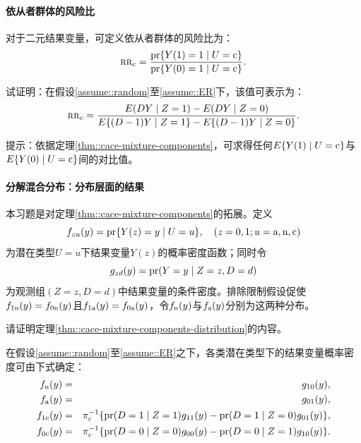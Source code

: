 \paragraph{依从者群体的风险比}\label{hw::rr-compliers}


对于二元结果变量，可定义依从者群体的风险比为：
$$
\textsc{rr}_{\textup{c}} = \frac{  \textup{pr}\{  Y(1) = 1\mid U = \textup{c} \}  }{ \textup{pr}\{  Y(0) = 1\mid U = \textup{c} \}   } .
$$

试证明：在假设\ref{assume::random}至\ref{assume::ER}下，该值可表示为：
$$
\textsc{rr}_{\textup{c}} =  \frac{  E(DY\mid Z=1)  - E(DY\mid Z=0)  }{  E\{  (D-1)Y\mid Z=1 \}   - E\{ (D-1)Y\mid Z=0 \} }.
$$



提示：依据定理\ref{thm::cace-mixture-components}，可求得任何$E\{  Y(1) \mid U = \textup{c} \} $与$E\{  Y(0) \mid U = \textup{c} \} $间的对比值。 


\paragraph{分解混合分布：分布层面的结果}\label{hw::disentangle-mixture-distrubution}


本习题是对定理\ref{thm::cace-mixture-components}的拓展。定义
$$
f_{zu}(y) = \textup{pr}\{  Y(z) = y  \mid U=u \},  \quad  (z=0,1;u=\textup{a}, \textup{n}, \textup{c})
$$
为潜在类型$U=u$下结果变量$Y(z)$的概率密度函数；同时令
$$
g_{zd}(y) = \textup{pr}(Y = y\mid Z=z, D=d)
$$
为观测组$(Z=z, D=d)$中结果变量的条件密度。排除限制假设促使$f_{1\textup{n}}(y) = f_{0\textup{n}} (y) $且$f_{1\textup{a}}(y) = f_{0\textup{a}}(y) $，令$f_{\textup{n}}(y)$与$ f_{\textup{a}} (y) $分别为这两种分布。 



请证明定理\ref{thm::cace-mixture-components-distribution}的内容。  


 
\begin{theorem}
\label{thm::cace-mixture-components-distribution}
在假设\ref{assume::random}至\ref{assume::ER}之下，各类潜在类型下的结果变量概率密度可由下式确定：
\begin{eqnarray*}
  f_{\textup{n}}(y) &=& g_{10}(y) ,\\
  f_{\textup{a}} (y) &=& g_{01}(y),\\
f_{1\textup{c}}(y) &=& \pi_{\textup{c}}^{-1} \{   \textup{pr}(D=1\mid Z=1 )g_{11}(y)  -  \textup{pr}(D=1\mid Z=0) g_{01}(y)   \} , \\
f_{0\textup{c}} (y) &=& \pi_{\textup{c}}^{-1} \{  \textup{pr}(D=0\mid Z=0)  g_{00}(y)  -  \textup{pr}(D=0\mid Z=1)  g_{10}(y)    \} . 
\end{eqnarray*}
\end{theorem}



